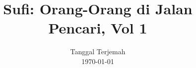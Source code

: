 


%




\title{Sufi: Orang-Orang di Jalan Pencari, Vol 1}
\date{Tanggal Terjemah\\
      \today}
\maketitle\thispagestyle{empty}
\pagestyle{empty}
\tableofcontents
\fancychapterstyle

\pagestyle{mystyle}
\setcounter{page}{1}
\ifdefined\theHchapter\else\newcommand\theHchapter{\arabic{chapter}}\fi
